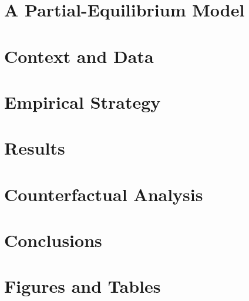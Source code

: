 \documentclass{article}
\begin{document}
\section{A Partial-Equilibrium Model}\label{sec:model}
    

\section{Context and Data}\label{sec:data}
    

\section{Empirical Strategy}\label{sec:empirical_strategy}
    

\section{Results}\label{sec:results}
    

\section{Counterfactual Analysis}\label{sec:counterfactual}
    

\section{Conclusions}\label{sec:conclusion}
    



\clearpage
\printbibliography

\clearpage
\section*{Figures and Tables}


\clearpage

\clearpage

\clearpage

\clearpage

\clearpage

\clearpage

\clearpage

\end{document}
